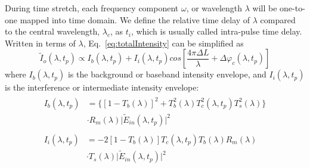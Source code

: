 \documentclass[aps,pra,reprint,longbibliography,superscriptaddress]{revtex4-1}
\begin{document}
During time stretch, each frequency component $\omega$, or wavelength $\lambda$ will be one-to-one mapped into time domain. We define the relative time delay of $\lambda$ compared to the central wavelength, $\lambda_c$, as $t_i$, which is usually called intra-pulse time delay. Written in terms of $\lambda$, Eq.~\ref{eq:totalIntensity} can be simplified as
\begin{equation} \label{eq:totalIntensitylambda}
\tilde{I}_o(\lambda, t_p) \propto I_b (\lambda, t_p) + I_i (\lambda, t_p) cos[ \frac{4\pi\Delta L}{\lambda} + \Delta \varphi_c(\lambda, t_p) ]
\end{equation}
where $I_b (\lambda, t_p)$ is the background or baseband intensity envelope, and $I_i (\lambda, t_p)$ is the interference or intermediate intensity envelope:
\begin{align}
\begin{split} \label{eq:backgroundIntensity}
I_b (\lambda, t_p) &= \Big\lbrace [1-T_b(\lambda)]^2 + T_b^2(\lambda) T_c^2(\lambda, t_p) T_s^2(\lambda) \Big\rbrace \\
&\cdot R_m(\lambda) \lvert \tilde{E}_{in}(\lambda, t_p)\rvert^2
\end{split}\\
\begin{split} \label{eq:interferenceIntensity}
I_i (\lambda, t_p) &= - 2 [1-T_b(\lambda)] T_c(\lambda, t_p) T_b(\lambda) R_m(\lambda)\\
& \cdot T_s(\lambda) \lvert \tilde{E}_{in}(\lambda, t_p)\rvert^2
\end{split}
\end{align}
\end{document}
